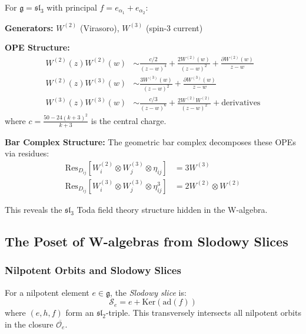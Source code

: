 \begin{example}\label{ex:w-sl3}
For $\mathfrak{g} = \mathfrak{sl}_3$ with principal $f = e_{\alpha_1} + e_{\alpha_2}$:

\textbf{Generators:} $W^{(2)}$ (Virasoro), $W^{(3)}$ (spin-3 current)

\textbf{OPE Structure:}
\begin{align}
W^{(2)}(z)W^{(2)}(w) &\sim \frac{c/2}{(z-w)^4} + \frac{2W^{(2)}(w)}{(z-w)^2} + \frac{\partial W^{(2)}(w)}{z-w} \\
W^{(2)}(z)W^{(3)}(w) &\sim \frac{3W^{(3)}(w)}{(z-w)^2} + \frac{\partial W^{(3)}(w)}{z-w} \\
W^{(3)}(z)W^{(3)}(w) &\sim \frac{c/3}{(z-w)^6} + \frac{2W^{(2)}W^{(2)}}{(z-w)^2} + \text{derivatives}
\end{align}
where $c = \frac{50 - 24(k+3)^2}{k+3}$ is the central charge.

\textbf{Bar Complex Structure:}
The geometric bar complex decomposes these OPEs via residues:
\begin{align}
\text{Res}_{D_{ij}}[W^{(2)}_i \otimes W^{(3)}_j \otimes \eta_{ij}] &= 3W^{(3)} \\
\text{Res}_{D_{ij}}[W^{(3)}_i \otimes W^{(3)}_j \otimes \eta_{ij}^3] &= 2W^{(2)} \otimes W^{(2)}
\end{align}

This reveals the $\mathfrak{sl}_3$ Toda field theory structure hidden in the W-algebra.
\end{example}

 
\subsection{The Poset of W-algebras from Slodowy Slices}
 
\subsubsection{Nilpotent Orbits and Slodowy Slices}
 
\begin{definition}\label{def:slodowy}
For a nilpotent element $e \in \mathfrak{g}$, the \emph{Slodowy slice} is:
\[
\mathcal{S}_e = e + \text{Ker}(\text{ad}(f))
\]
where $(e,h,f)$ form an $\mathfrak{sl}_2$-triple. This transversely intersects all nilpotent orbits 
in the closure $\overline{\mathcal{O}_e}$.
\end{definition}
 
